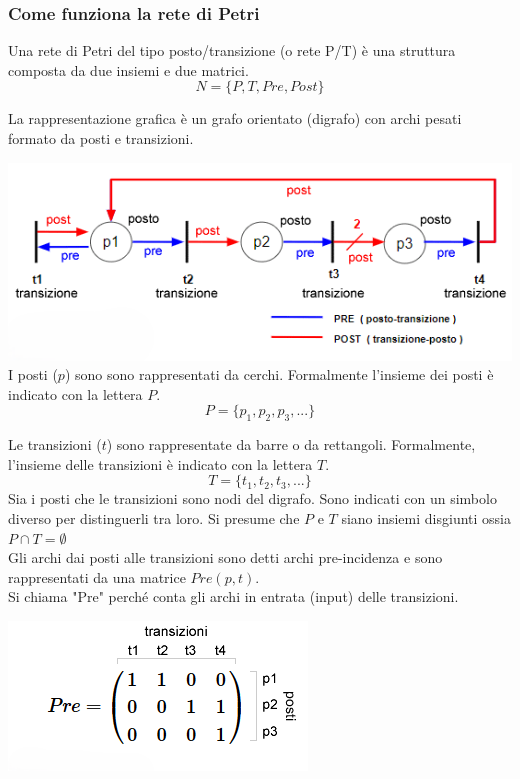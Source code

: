 \documentclass{article}
\begin{document}
\subsubsection{Come funziona la rete di Petri}

Una rete di Petri del tipo posto/transizione (o rete P/T) è una struttura composta da due insiemi e due matrici.
\[
N = \{ P,T,Pre, Post \}
\]

La rappresentazione grafica è un grafo orientato (digrafo) con archi pesati formato da posti e transizioni.

\includegraphics{imgGrafi/rete-di-petri-spiegazione.png}\\

I posti ($p$) sono sono rappresentati da cerchi. Formalmente l'insieme dei posti è indicato con la lettera $P$.
\[
P = \{ p_1, p_2, p_3, ... \}
\]

Le transizioni ($t$) sono rappresentate da barre o da rettangoli. Formalmente, l'insieme delle transizioni è indicato con la lettera $T$.
\[
T = \{ t_1, t_2, t_3, ... \}
\]
Sia i posti che le transizioni sono nodi del digrafo. Sono indicati con un simbolo diverso per distinguerli tra loro. Si presume che $P$ e $T$ siano insiemi disgiunti ossia $P \cap T = \emptyset$ \\

Gli archi dai posti alle transizioni sono detti archi pre-incidenza e sono rappresentati da una matrice $Pre(p,t)$. \\
Si chiama "Pre" perché conta gli archi in entrata (input) delle transizioni.
\begin{center}
    \includegraphics{imgGrafi/matrice-pre-incidenza-esempio.png}
\end{center}
\end{document}
